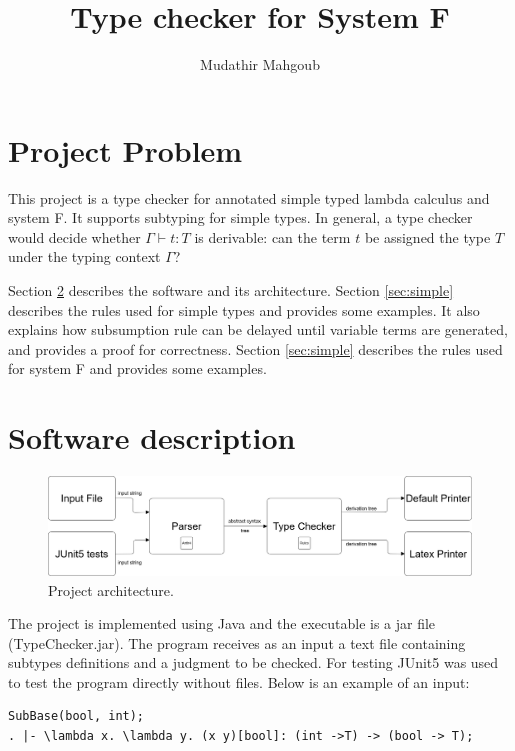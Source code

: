 \documentclass[12pt,a4paper]{article}
\author{Mudathir Mahgoub}
\title{Type checker for System F}
\begin{document}
\maketitle

\section {Project Problem}

This project is a type checker for annotated simple typed lambda calculus and system F. It supports subtyping for simple types. In general, a type checker would decide whether $\Gamma \vdash t: T$ is derivable: can the term $t$ be assigned the type $T$ under the typing context $\Gamma$?

Section \ref{sec:software} describes the software and its architecture. Section \ref{sec:simple} describes the rules used for simple types and provides some examples. It also explains how subsumption rule can be delayed until variable terms are generated, and provides a proof for correctness. Section \ref{sec:simple} describes the rules used for system F and provides some examples.

\section{Software description} \label{sec:software}


\begin{figure}[h]
 \centering
 \includegraphics[scale=.25,keepaspectratio=true]{./typechecker.png}
 \caption{Project architecture.}
 \label{fig:gantt_chart}
\end{figure}

The project is implemented using Java and the executable is a jar file (TypeChecker.jar). The program receives as an input a text file containing subtypes definitions and a judgment to be checked. For testing JUnit5 was used to test the program directly without files. Below is an example of an input:

\begin{lstlisting}
SubBase(bool, int);
. |- \lambda x. \lambda y. (x y)[bool]: (int ->T) -> (bool -> T);
\end{lstlisting}
\end{document}
